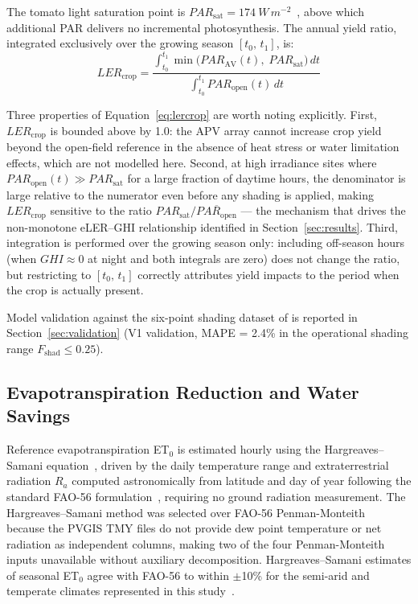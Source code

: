 The tomato light saturation point is
$PAR_{\text{sat}} = \SI{174}{W\,m^{-2}}$~\citep{mohammedi2023,
heuvelink2005}, above which additional PAR delivers no incremental
photosynthesis. The annual yield ratio, integrated exclusively over
the growing season $[t_0,\,t_1]$, is:
\begin{equation}
    LER_{\text{crop}}
        = \frac{\displaystyle\int_{t_0}^{t_1}
                \min\!\bigl(PAR_{\text{AV}}(t),\;PAR_{\text{sat}}\bigr)\,dt}
               {\displaystyle\int_{t_0}^{t_1}
                PAR_{\text{open}}(t)\,dt}
    \label{eq:lercrop}
\end{equation}

Three properties of Equation~\ref{eq:lercrop} are worth noting
explicitly. First, $LER_{\text{crop}}$ is bounded above by 1.0: the
APV array cannot increase crop yield beyond the open-field reference
in the absence of heat stress or water limitation effects, which are
not modelled here. Second, at high irradiance sites where
$PAR_{\text{open}}(t) \gg PAR_{\text{sat}}$ for a large fraction of
daytime hours, the denominator is large relative to the numerator
even before any shading is applied, making $LER_{\text{crop}}$
sensitive to the ratio $PAR_{\text{sat}}/\overline{PAR_{\text{open}}}$
--- the mechanism that drives the non-monotone eLER--GHI relationship
identified in Section~\ref{sec:results}. Third, integration is
performed over the growing season only: including off-season hours
(when $GHI \approx 0$ at night and both integrals are zero) does not
change the ratio, but restricting to $[t_0,\,t_1]$ correctly attributes
yield impacts to the period when the crop is actually present.

Model validation against the six-point shading dataset of
\citet{mohammedi2023} is reported in Section~\ref{sec:validation}
(V1 validation, MAPE = 2.4\% in the operational shading range
$F_{\text{shad}} \leq 0.25$).

\subsection{Evapotranspiration Reduction and Water Savings}
\label{sec:et}

\hspace{1cm}Reference evapotranspiration ET$_0$ is estimated hourly
using the Hargreaves--Samani equation~\citep{hargreaves1985}, driven
by the daily temperature range and extraterrestrial radiation $R_a$
computed astronomically from latitude and day of year following the
standard FAO-56 formulation~\citep{allen1998}, requiring no ground
radiation measurement. The Hargreaves--Samani method was
selected over FAO-56 Penman-Monteith~\citep{allen1998} because the
PVGIS TMY files do not provide dew point temperature or net radiation
as independent columns, making two of the four Penman-Monteith inputs
unavailable without auxiliary decomposition. Hargreaves--Samani
estimates of seasonal ET$_0$ agree with FAO-56 to within $\pm$10\%
for the semi-arid and temperate climates represented in this
study~\citep{droogers2002}.

